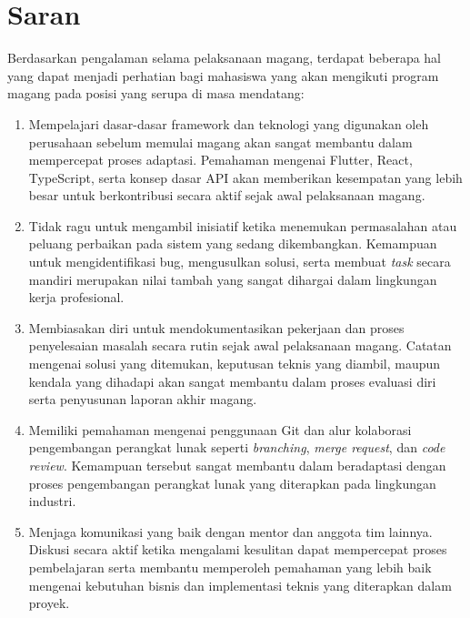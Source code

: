 \section{Saran}

Berdasarkan pengalaman selama pelaksanaan magang, terdapat beberapa hal yang
dapat menjadi perhatian bagi mahasiswa yang akan mengikuti program magang pada
posisi yang serupa di masa mendatang:

\begin{enumerate}
      \item Mempelajari dasar-dasar framework dan teknologi yang digunakan oleh perusahaan
            sebelum memulai magang akan sangat membantu dalam mempercepat proses adaptasi.
            Pemahaman mengenai Flutter, React, TypeScript, serta konsep dasar API akan
            memberikan kesempatan yang lebih besar untuk berkontribusi secara aktif sejak
            awal pelaksanaan magang.

      \item Tidak ragu untuk mengambil inisiatif ketika menemukan permasalahan atau peluang
            perbaikan pada sistem yang sedang dikembangkan. Kemampuan untuk
            mengidentifikasi bug, mengusulkan solusi, serta membuat \textit{task} secara
            mandiri merupakan nilai tambah yang sangat dihargai dalam lingkungan kerja
            profesional.

      \item Membiasakan diri untuk mendokumentasikan pekerjaan dan proses penyelesaian
            masalah secara rutin sejak awal pelaksanaan magang. Catatan mengenai solusi
            yang ditemukan, keputusan teknis yang diambil, maupun kendala yang dihadapi
            akan sangat membantu dalam proses evaluasi diri serta penyusunan laporan akhir
            magang.

      \item Memiliki pemahaman mengenai penggunaan Git dan alur kolaborasi pengembangan
            perangkat lunak seperti \textit{branching}, \textit{merge request}, dan
            \textit{code review}. Kemampuan tersebut sangat membantu dalam beradaptasi
            dengan proses pengembangan perangkat lunak yang diterapkan pada lingkungan
            industri.

      \item Menjaga komunikasi yang baik dengan mentor dan anggota tim lainnya. Diskusi
            secara aktif ketika mengalami kesulitan dapat mempercepat proses pembelajaran
            serta membantu memperoleh pemahaman yang lebih baik mengenai kebutuhan bisnis
            dan implementasi teknis yang diterapkan dalam proyek.
\end{enumerate}